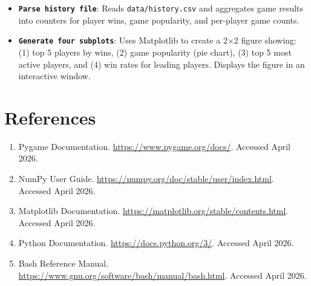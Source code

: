 \documentclass[12pt,a4paper]{article}
\begin{document}
\begin{itemize}
    \item \textbf{\texttt{Parse history file}}: Reads \texttt{data/history.csv} and aggregates game results into counters for player wins, game popularity, and per-player game counts.
    
    \item \textbf{\texttt{Generate four subplots}}: Uses Matplotlib to create a 2×2 figure showing: (1) top 5 players by wins, (2) game popularity (pie chart), (3) top 5 most active players, and (4) win rates for leading players. Displays the figure in an interactive window.
\end{itemize}

\section{References}

\begin{enumerate}
    \item Pygame Documentation. \url{https://www.pygame.org/docs/}. Accessed April 2026.
    \item NumPy User Guide. \url{https://numpy.org/doc/stable/user/index.html}. Accessed April 2026.
    \item Matplotlib Documentation. \url{https://matplotlib.org/stable/contents.html}. Accessed April 2026.
    \item Python Documentation. \url{https://docs.python.org/3/}. Accessed April 2026.
    \item Bash Reference Manual. \url{https://www.gnu.org/software/bash/manual/bash.html}. Accessed April 2026.
\end{enumerate}
\end{document}
